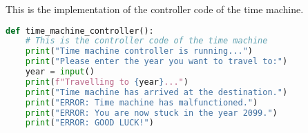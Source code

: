 This is the implementation of the controller code of the time machine.

\begin{lstlisting}[language=Python, caption=Time Machine Demo]
def time_machine_controller():
    # This is the controller code of the time machine
    print("Time machine controller is running...")
    print("Please enter the year you want to travel to:")
    year = input()
    print(f"Travelling to {year}...")
    print("Time machine has arrived at the destination.")
    print("ERROR: Time machine has malfunctioned.")
    print("ERROR: You are now stuck in the year 2099.")
    print("ERROR: GOOD LUCK!")
\end{lstlisting}